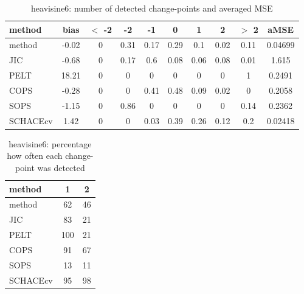\begin{table}[ht]
\centering
\begin{tabular}{l|c|ccccccc|c}
  \hline
method & bias & $<$ -2 & -2 & -1 & 0 & 1 & 2 & $>$ 2 & aMSE \\ 
  \hline
method & -0.02 &     0 &  0.31 &  0.17 &  0.29 &   0.1 &  0.02 &  0.11 & 0.04699 \\ 
  JIC & -0.68 &     0 &  0.17 &   0.6 &  0.08 &  0.06 &  0.08 &  0.01 & 1.615 \\ 
  PELT & 18.21 &     0 &     0 &     0 &     0 &     0 &     0 &     1 & 0.2491 \\ 
  COPS & -0.28 &     0 &     0 &  0.41 &  0.48 &  0.09 &  0.02 &     0 & 0.2058 \\ 
  SOPS & -1.15 &     0 &  0.86 &     0 &     0 &     0 &     0 &  0.14 & 0.2362 \\ 
  SCHACEcv &  1.42 &     0 &     0 &  0.03 &  0.39 &  0.26 &  0.12 &   0.2 & 0.02418 \\ 
   \hline
\end{tabular}
\caption{heavisine6: number of detected change-points and averaged MSE} 
\label{tab:heavisine6Njumps}
\end{table}
\begin{table}[ht]
\centering
\begin{tabular}{l|cc}
  \hline
method & 1 & 2 \\ 
  \hline
method &     62 &     46 \\ 
  JIC &     83 &     21 \\ 
  PELT &    100 &     21 \\ 
  COPS &     91 &     67 \\ 
  SOPS &     13 &     11 \\ 
  SCHACEcv &     95 &     98 \\ 
   \hline
\end{tabular}
\caption{heavisine6: percentage how often each change-point was detected} 
\label{tab:heavisine6Detections}
\end{table}
